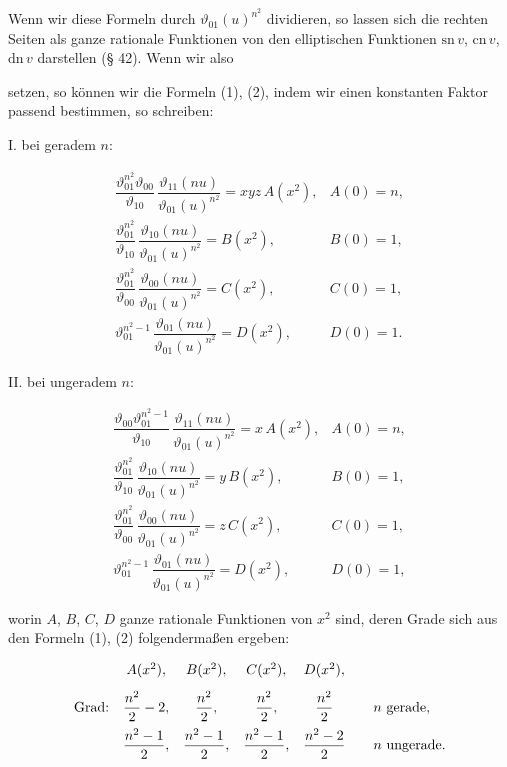 
Wenn wir diese Formeln durch $\vartheta_{01}(u)^{n^2}$ dividieren,
so lassen sich die rechten Seiten als ganze rationale Funktionen
von den elliptischen Funktionen $\mathrm{sn}\,v$, $\mathrm{cn}\,v$,
$\mathrm{dn}\,v$ darstellen (§ 42). Wenn wir also


setzen, so können wir die Formeln (1), (2), indem wir einen
konstanten Faktor passend bestimmen, so schreiben:

I. bei geradem $n$:

\[
\begin{array}{ll}
\dfrac{\vartheta_{01}^{n^2}\vartheta_{00}}{\vartheta_{10}}\,\dfrac{\vartheta_{11}(nu)}{\vartheta_{01}(u)^{n^2}} = xyz\,A(x^2), & A(0)=n,\\[3mm]
\dfrac{\vartheta_{01}^{n^2}}{\vartheta_{10}}\,\dfrac{\vartheta_{10}(nu)}{\vartheta_{01}(u)^{n^2}} = B(x^2), & B(0)=1,\\[3mm]
\dfrac{\vartheta_{01}^{n^2}}{\vartheta_{00}}\,\dfrac{\vartheta_{00}(nu)}{\vartheta_{01}(u)^{n^2}} = C(x^2), & C(0)=1,\\[3mm]
\vartheta_{01}^{n^2-1}\,\dfrac{\vartheta_{01}(nu)}{\vartheta_{01}(u)^{n^2}} = D(x^2), & D(0)=1.
\end{array}
\]

II. bei ungeradem $n$:

\[
\begin{array}{ll}
\dfrac{\vartheta_{00}\vartheta_{01}^{n^2-1}}{\vartheta_{10}}\,\dfrac{\vartheta_{11}(nu)}{\vartheta_{01}(u)^{n^2}} = x\,A(x^2), & A(0)=n,\\[3mm]
\dfrac{\vartheta_{01}^{n^2}}{\vartheta_{10}}\,\dfrac{\vartheta_{10}(nu)}{\vartheta_{01}(u)^{n^2}} = y\,B(x^2), & B(0)=1,\\[3mm]
\dfrac{\vartheta_{01}^{n^2}}{\vartheta_{00}}\,\dfrac{\vartheta_{00}(nu)}{\vartheta_{01}(u)^{n^2}} = z\,C(x^2), & C(0)=1,\\[3mm]
\vartheta_{01}^{n^2-1}\,\dfrac{\vartheta_{01}(nu)}{\vartheta_{01}(u)^{n^2}} = D(x^2), & D(0)=1,
\end{array}
\]

worin $A$, $B$, $C$, $D$ ganze rationale Funktionen von $x^2$ sind,
deren Grade sich aus den Formeln (1), (2) folgendermaßen ergeben:

\[
\begin{array}{c@{\quad}cccc@{\qquad}l}
 & A(x^2), & B(x^2), & C(x^2), & D(x^2), & \\[3mm]
\text{Grad:} & \dfrac{n^2}{2}-2, & \dfrac{n^2}{2}, & \dfrac{n^2}{2}, & \dfrac{n^2}{2} & n \text{ gerade,}\\[3mm]
 & \dfrac{n^2-1}{2}, & \dfrac{n^2-1}{2}, & \dfrac{n^2-1}{2}, & \dfrac{n^2-2}{2} & n \text{ ungerade.}
\end{array}
\]

